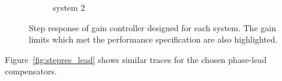 \documentclass[a4paper,10pt,twocolumn]{article}
\begin{document}
\begin{figure}[H]
\begin{subfigure}{0.5\textwidth}
		\caption{\sc system 2}
	\end{subfigure}
	\caption{Step response of gain controller designed for each system. The gain limits which met the performance specification are also highlighted.}
	\label{fig:stepres_p}
\end{figure}

Figure~\ref{fig:stepres_lead} shows similar traces for the chosen phase-lead compensators.
\end{document}
